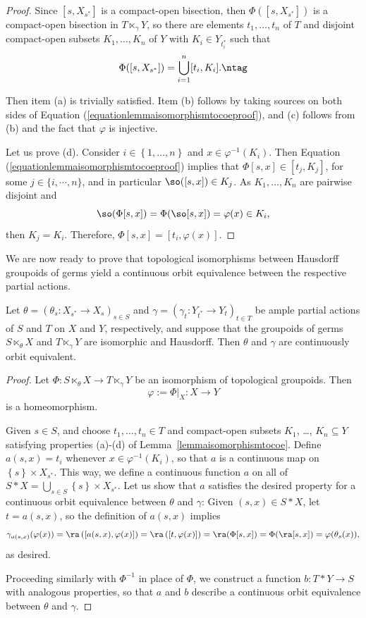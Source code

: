 \begin{proof}
Since $[s, X_{s^*}]$ is a compact-open bisection, then $\Phi([s, X_{s^*}])$ is a compact-open bisection in $T \ltimes_\gamma Y$, so there are elements $t_1, \ldots, t_n $ of $T$ and disjoint compact-open subsets $K_1,\ldots, K_n $ of $Y$ with $K_i \in Y_{t_i^*}$ such that
\[\Phi([s,X_{s^*}])=\bigcup_{i=1}^n[t_i,K_i].\ntag\label{equationlemmaisomorphismtocoeproof}\]

Then item (a) is trivially satisfied. Item (b) follows by taking sources on both sides of Equation (\ref{equationlemmaisomorphismtocoeproof}), and (c) follows from (b) and the fact that $\varphi$ is injective.

Let us prove (d). Consider $i\in\left\{1,\ldots,n\right\}$ and $x \in \varphi^{-1}(K_i)$. Then Equation (\ref{equationlemmaisomorphismtocoeproof}) implies that $\Phi[s,x]\in [t_j, K_j]$, for some $j \in \{i, \cdots, n \}$, and in particular $\so([s,x])\in K_j$. As $K_1,\ldots,K_n$ are pairwise disjoint and
\[\so(\Phi[s,x])=\Phi(\so[s,x])=\varphi(x)\in K_i,\]
then $K_j=K_i$. Therefore, $\Phi[s,x]=[t_i,\varphi(x)]$.\qedhere
\end{proof}

We are now ready to prove that topological isomorphisms between Hausdorff groupoids of germs yield a continuous orbit equivalence between the respective partial actions.

\begin{theorem}\label{theo:groupoidgermscoe}
Let $\theta=\left(\theta_s:X_{s^*}\to X_s\right)_{s\in S}$ and $\gamma=\left(\gamma_t:Y_{t^*}\to Y_t\right)_{t\in T}$ be ample partial actions of $S$ and $T$ on $X$ and $Y$, respectively, and suppose that the groupoids of germs $S \ltimes_\theta X$ and $T \ltimes_\gamma Y$ are isomorphic and Hausdorff. Then $\theta$ and $\gamma$ are continuously orbit equivalent.
\end{theorem}

\begin{proof}
Let $\Phi : S \ltimes_\theta X \rightarrow  T \ltimes_\gamma Y$ be an isomorphism of topological groupoids. Then 
\[\varphi:= \Phi|_X: X \rightarrow Y\]
is a homeomorphism.

Given $s\in S$, and choose $t_1,\ldots,t_n\in T$ and compact-open subsets $K_1$, \ldots, $K_n\subseteq Y$ satisfying properties (a)-(d) of Lemma~\ref{lemmaisomorphismtocoe}. Define $a(s,x)=t_i$ whenever $x\in\varphi^{-1}(K_i)$, so that $a$ is a continuous map on $\left\{s\right\}\times X_{s^*}$. This way, we define a continuous function $a$ on all of $S\ast X=\bigcup_{s\in S}\left\{s\right\}\times X_{s^*}$. Let us show that $a$ satisfies the desired property for a continuous orbit equivalence between $\theta$ and $\gamma$: Given $(s,x)\in S\ast X$, let $t=a(s,x)$, so the definition of $a(s,x)$ implies
\[\gamma_{a(s,x)}(\varphi(x))=\ra\left([a(s,x),\varphi(x)]\right)=\ra\left([t,\varphi(x)]\right)=\ra(\Phi[s,x])=\Phi(\ra[s,x])=\varphi(\theta_s(x)),\]
as desired.

Proceeding similarly with $\Phi^{-1}$ in place of $\Phi$, we construct a function $b:T\ast Y\to S$ with analogous properties, so that $a$ and $b$ describe a continuous orbit equivalence between $\theta$ and $\gamma$.\qedhere
\end{proof}

